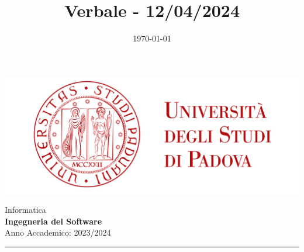 \documentclass[5pt]{article}
\title{ Verbale - 12/04/2024 }
\date{\today}
\begin{document}


    \vspace{8pt}
    \includegraphics[scale=0.2]{UNIPDFull.png}

\vspace{10pt}

\begin{minipage}[t]{0.48\textwidth}
        \begin{flushleft}
            Informatica\\
            \vspace{5pt}
            \textbf{\LARGE Ingegneria del Software}\\
            Anno Accademico: 2023/2024
        \end{flushleft}
\end{minipage}


\vspace{5px}


\rule{\textwidth}{5pt}
\end{document}
